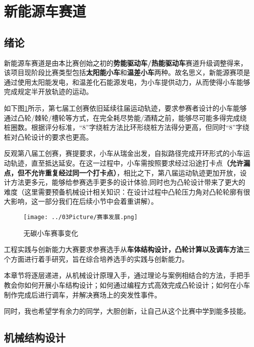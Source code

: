 
\section{新能源车赛道}
\subsection{绪论}
新能源车赛道是由本比赛创始之初的\textbf{势能驱动车/热能驱动车}赛道升级调整得来，该项目现阶段比赛类型包括\textbf{太阳能小车}和\textbf{温差小车}两种。故名思义，新能源赛项是通过使用太阳能发电，和温差化石能源发电，为小车提供动力，从而使得小车能够完成规定半开放轨迹的运动。

如下图\ref{fig:1}所示，第七届工创赛依旧延续往届运动轨迹，要求参赛者设计的小车能够通过凸轮/棘轮/槽轮等方式，在完全耗尽势能/酒精之前，能够尽可能多得完成绕桩圈数。根据评分标准，“8”字绕桩方法比环形绕桩方法得分更高，但同时“8”字绕桩对凸轮设计的要求也更高。

反观第八届工创赛，赛提要求，小车从瑞金出发，自拟路径完成开环形式的小车运动轨迹，直至抵达延安。在这一过程中，小车需按照要求经过沿途打卡点\textbf{（允许漏点，但不允许重复经过同一个打卡点）}，相比之下，第八届运动轨迹更加开放，设计方法更多元，能够给参赛选手更多的设计体验,同时也为凸轮设计带来了更大的难度（这里需要预备机械设计相关知识：在设计过程中凸轮压力角对凸轮轮廓有很大影响，这一部分我们在后续小节中会着重讲解）。
\begin{figure}[htbp]
    \centering
    \texttt{[image: ../03Picture/赛事发展.png]}
    \caption{无碳小车赛事变化}
    \label{fig:1}
\end{figure}

工程实践与创新能力大赛要求参赛选手从\textbf{车体结构设计，凸轮计算以及调车方法}三个方面进行着手研究，旨在综合培养选手的实践与创新能力。

本章节将逐层递进，从机械设计原理入手，通过理论与案例相结合的方法，手把手教会你如何开展小车结构设计；如何通过编程方式高效完成凸轮设计；如何在小车制作完成后进行调车，并解决赛场上的突发性事件。

同时，我也希望学有余力的同学，大胆创新，让自己从这个比赛中学到能多技能。

\vspace{30pt}
\subsection{机械结构设计}
